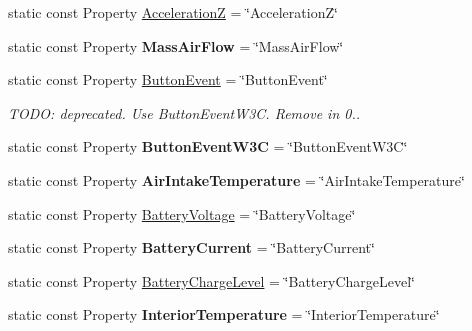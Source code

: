 \begin{DoxyCompactItemize}
\item 
static const Property \hyperlink{classVehicleProperty_a1ce0b3be3a09d5a96741890d0d67496f}{Acceleration\+Z} = \char`\"{}Acceleration\+Z\char`\"{}
\item 
\hypertarget{classVehicleProperty_aabc6b6b50b8a31bfe197cbd3ae0827a1}{static const Property {\bfseries Mass\+Air\+Flow} = \char`\"{}Mass\+Air\+Flow\char`\"{}}\label{classVehicleProperty_aabc6b6b50b8a31bfe197cbd3ae0827a1}

\item 
static const Property \hyperlink{classVehicleProperty_ab9fa252d209fbd2eb014c4d934d3d615}{Button\+Event} = \char`\"{}Button\+Event\char`\"{}
\begin{DoxyCompactList}\small\item\em T\+O\+D\+O\+: deprecated. Use Button\+Event\+W3\+C. Remove in 0.. \end{DoxyCompactList}\item 
\hypertarget{classVehicleProperty_a639ded1cfbf786fbd3054d7909590d1d}{static const Property {\bfseries Button\+Event\+W3\+C} = \char`\"{}Button\+Event\+W3\+C\char`\"{}}\label{classVehicleProperty_a639ded1cfbf786fbd3054d7909590d1d}

\item 
\hypertarget{classVehicleProperty_af4cbbae11228729335c50aa2d1fa2e28}{static const Property {\bfseries Air\+Intake\+Temperature} = \char`\"{}Air\+Intake\+Temperature\char`\"{}}\label{classVehicleProperty_af4cbbae11228729335c50aa2d1fa2e28}

\item 
static const Property \hyperlink{classVehicleProperty_a43a70a277b955ae35a9ba795d2052591}{Battery\+Voltage} = \char`\"{}Battery\+Voltage\char`\"{}
\item 
\hypertarget{classVehicleProperty_a3447a00e8ca09d12b208bc7c210a61b8}{static const Property {\bfseries Battery\+Current} = \char`\"{}Battery\+Current\char`\"{}}\label{classVehicleProperty_a3447a00e8ca09d12b208bc7c210a61b8}

\item 
static const Property \hyperlink{classVehicleProperty_a71025201c20a84f3303b32b08872113a}{Battery\+Charge\+Level} = \char`\"{}Battery\+Charge\+Level\char`\"{}
\item 
\hypertarget{classVehicleProperty_adbbb68033f8531903ff3e3024864eef3}{static const Property {\bfseries Interior\+Temperature} = \char`\"{}Interior\+Temperature\char`\"{}}\label{classVehicleProperty_adbbb68033f8531903ff3e3024864eef3}


\end{DoxyCompactItemize}
